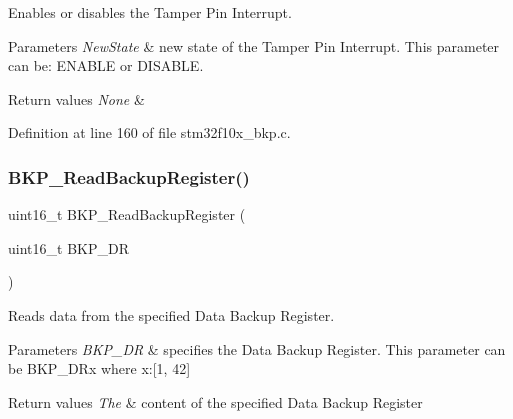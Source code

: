 Enables or disables the Tamper Pin Interrupt. 


\begin{DoxyParams}{Parameters}
{\em New\+State} & new state of the Tamper Pin Interrupt. This parameter can be\+: E\+N\+A\+B\+LE or D\+I\+S\+A\+B\+LE. \\
\hline
\end{DoxyParams}

\begin{DoxyRetVals}{Return values}
{\em None} & \\
\hline
\end{DoxyRetVals}


Definition at line 160 of file stm32f10x\+\_\+bkp.\+c.

\mbox{\label{group___b_k_p___private___functions_ga359d8fbc945e0f4e34fedbe037d842c8}} 
\subsubsection{\texorpdfstring{B\+K\+P\+\_\+\+Read\+Backup\+Register()}{BKP\_ReadBackupRegister()}}
{\footnotesize\ttfamily uint16\+\_\+t B\+K\+P\+\_\+\+Read\+Backup\+Register (\begin{DoxyParamCaption}\item[{uint16\+\_\+t}]{B\+K\+P\+\_\+\+DR }\end{DoxyParamCaption})}



Reads data from the specified Data Backup Register. 


\begin{DoxyParams}{Parameters}
{\em B\+K\+P\+\_\+\+DR} & specifies the Data Backup Register. This parameter can be B\+K\+P\+\_\+\+D\+Rx where x\+:\mbox{[}1, 42\mbox{]} \\
\hline
\end{DoxyParams}

\begin{DoxyRetVals}{Return values}
{\em The} & content of the specified Data Backup Register \\
\hline
\end{DoxyRetVals}


